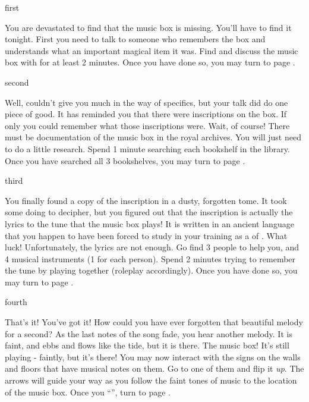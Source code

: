 \documentclass[greennotebook]{NeptuneBall}
\begin{document}

\startnotebook{\nMusicBox{}}

\begin{page}{first}

You are devastated to find that the music box is missing. You'll have to find it tonight. First you need to talk to someone who remembers the box and understands what an important magical item it was. Find \cManta{} and discuss the music box with \cManta{\them} for at least 2 minutes. Once you have done so, you may turn to page .

\end{page}

\begin{page}{second}

Well, \cManta{} couldn't give you much in the way of specifics, but your talk did do one piece of good. It has reminded you that there were inscriptions on the box. If only you could remember what those inscriptions were. Wait, of course! There must be documentation of the music box in the royal archives. You will just need to do a little research. Spend 1 minute searching each bookshelf in the library. Once you have searched all 3 bookshelves, you may turn to page .

\end{page}

\begin{page}{third}

You finally found a copy of the inscription in a dusty, forgotten tome. It took some doing to decipher, but you figured out that the inscription is actually the lyrics to the tune that the music box plays! It is written in an ancient language that you happen to have been forced to study in your training as a \cAriel{\prince} of \pAtlantis{}. What luck! Unfortunately, the lyrics are not enough. Go find 3 people to help you, and 4 musical  instruments (1 for each person). Spend 2 minutes trying to remember the tune by playing together (roleplay accordingly). Once you have done so, you may turn to page .

\end{page}

\begin{page}{fourth}

That's it! You've got it! How could you have ever forgotten that beautiful melody for a second? As the last notes of the song fade, you hear another melody. It is faint, and ebbs and flows like the tide, but it is there. The music box! It's still playing - faintly, but it's there! You may now interact with the signs on the walls and floors that have musical notes on them. Go to one of them and flip it \emph{up}. The arrows will guide your way as you follow the faint tones of music to the location of the music box. Once you ``\sPacketA{}'', turn to page .

\end{page}
\end{document}
